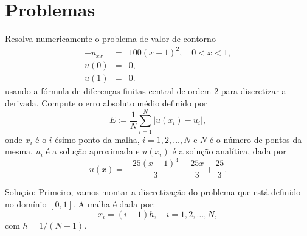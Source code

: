 \section{Problemas}
\begin{ex}\label{ex_Jacobi_2} Resolva numericamente o problema de valor de contorno
  \begin{eqnarray*}
    -u_{xx} &=& 100(x-1)^2,\quad 0 < x < 1,\label{eq:pvc2-eq}\\
    u(0) &=& 0,\label{eq:pvc2-bc1}\\
    u(1) &=& 0.\label{eq:pvc2-bc2}
  \end{eqnarray*}
usando a fórmula de diferenças finitas central de ordem 2 para discretizar a derivada. Compute o erro absoluto médio definido por
\begin{equation*}
  E := \frac{1}{N}\sum_{i=1}^N \left|u(x_i) - u_i\right|,
\end{equation*}
onde $x_i$ é o $i$-ésimo ponto da malha, $i=1, 2, \dotsc, N$ e $N$ é o número de pontos da mesma, $u_i$ é a solução aproximada e $u(x_i)$ é a solução analítica, dada por
\begin{equation*}
  u(x) = -\frac{25(x-1)^4}{3} - \frac{25x}{3} + \frac{25}{3}.
\end{equation*}
\end{ex}
Solução: Primeiro, vamos montar a discretização do problema que está definido no domínio $[0,1]$. A malha é dada por:
  \begin{equation*}
    x_i = (i-1)h,\quad i=1, 2, \dotsc, N,
  \end{equation*}
com $h = 1/(N-1)$.

